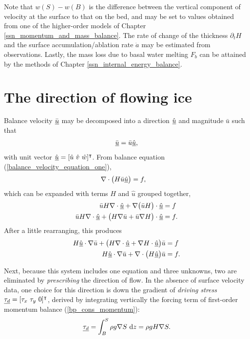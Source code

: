 Note that $w(S) - w(B)$ is the difference between the vertical component of velocity at the surface to that on the bed, and may be set to values obtained from one of the higher-order models of Chapter \ref{ssn_momentum_and_mass_balance}.  The rate of change of the thickness $\partial_t H$ and the surface accumulation/ablation rate $\dot{a}$ may be estimated from observations.  Lastly, the mass loss due to basal water melting $F_b$ can be attained by the methods of Chapter \ref{ssn_internal_energy_balance}.

\section{The direction of flowing ice}

Balance velocity $\bar{\underline{u}}$ may be decomposed into a direction $\hat{\underline{u}}$ and magnitude $\bar{u}$ \citep{brinkerhoff_2015} such that
\begin{align}
  \label{balance_velocity_dir_and_mag}
  \bar{\underline{u}} = \bar{u} \underline{\hat{u}},
\end{align}
with unit vector $\hat{\rankone{u}} = [\hat{u}\ \hat{v}\ \hat{w}]\T$.  From balance equation (\ref{balance_velocity_equation_one}),
\begin{align}
  \label{balance_velocity_equation}
  \nabla \cdot \big( H \bar{u} \underline{\hat{u}} \big) &= f,
\end{align}
which can be expanded with terms $H$ and $\hat{u}$ grouped together,
\begin{align*}
  \bar{u} H \nabla \cdot \underline{\hat{u}} + \nabla \big( \bar{u} H \big) \cdot \underline{\hat{u}} &= f \\
  \bar{u} H \nabla \cdot \underline{\hat{u}} + \big( H \nabla \bar{u} + \bar{u} \nabla H \big) \cdot \underline{\hat{u}} &= f.
\end{align*}
After a little rearranging, this produces
\begin{align}
  H \hat{\underline{u}} \cdot \nabla \bar{u} + \big( H \nabla \cdot \underline{\hat{u}} + \nabla H \cdot \underline{\hat{u}} \big) \bar{u} &= f \notag \\
  \label{balance_velocity_equation_expanded}
  H \hat{\underline{u}} \cdot \nabla \bar{u} + \nabla \cdot \big( H \underline{\hat{u}} \big) \bar{u} &= f.
\end{align}

Next, because this system includes one equation and three unknowns, two are eliminated by \emph{prescribing} the direction of flow.  In the absence of surface velocity data, one choice for this direction is down the gradient of  \emph{driving stress} $\underline{\tau_d} = [\tau_x\ \tau_y\ 0]^\intercal$, derived by integrating vertically the forcing term of first-order momentum balance (\ref{bp_cons_momentum}):
\begin{align}
  \label{driving_stress}
  \underline{\tau_d} = \int_B^S \rho g \nabla S \ \mathrm{d}z = \rho g H \nabla S.
\end{align}

